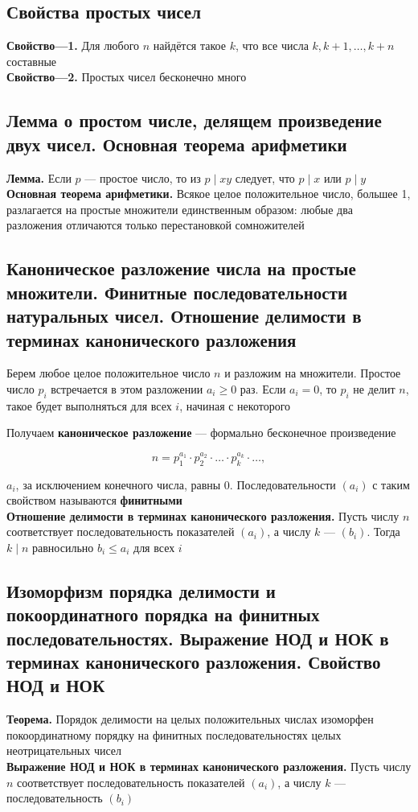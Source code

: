 \documentclass[a4paper]{article}
\begin{document}
\subsection{Свойства простых чисел}
\textbf{Свойство—1.} Для любого $n$ найдётся такое $k$, что все числа $k, k + 1,\ldots, k + n$ составные\\[2mm]
\indent\textbf{Свойство—2.} Простых чисел бесконечно много

\subsection{Лемма о простом числе, делящем произведение двух чисел. Основная теорема арифметики}
\textbf{Лемма.} Если $p$ — простое число, то из $p \mid xy$ следует, что $p \mid x$ или $p \mid y$\\[2mm]
\indent\textbf{Основная теорема арифметики.} Всякое целое положительное число, большее 1, разлагается на простые множители единственным образом: любые два разложения отличаются только перестановкой сомножителей

\subsection{Каноническое разложение числа на простые множители. Финитные последовательности натуральных чисел. Отношение делимости в терминах канонического разложения}
Берем любое целое положительное число $n$ и разложим на множители. Простое число $p_{i}$ встречается в этом разложении $a_{i} \geqslant 0$ раз. Если $a_{i}=0$, то $p_{i}$ не делит $n$, такое будет выполняться для всех $i$, начиная с некоторого

Получаем \textbf{каноническое разложение} — формально бесконечное произведение

\begin{equation}
n=p_{1}^{a_{1}} \cdot p_{2}^{a_{2}} \cdot \ldots \cdot p_{k}^{a_{k}} \cdot \ldots, \tag{1.65.1}\label{eq:1.65.1}
\end{equation}

 $a_i$, за исключением конечного числа, равны 0. Последовательности $(a_i)$ с таким свойством называются \textbf{финитными}\\[2mm]
\indent\textbf{Отношение делимости в терминах канонического разложения.} Пусть числу $n$ соответствует последовательность показателей $(a_i)$, а числу $k$ — $(b_i)$. Тогда $k \mid n$ равносильно $b_i\leqslant a_i$ для всех $i$

\subsection{Изоморфизм порядка делимости и покоординатного порядка на финитных последовательностях. Выражение НОД и НОК в терминах канонического разложения. Свойство НОД и НОК}
\textbf{Теорема.} Порядок делимости на целых положительных числах изоморфен покоординатному порядку на финитных последовательностях целых неотрицательных чисел\\[2mm]
\indent\textbf{Выражение НОД и НОК в терминах канонического разложения.} Пусть числу $n$ соответствует последовательность показателей $\left(a_{i}\right)$, а числу $k$ — последовательность $\left(b_{i}\right)$
\end{document}
